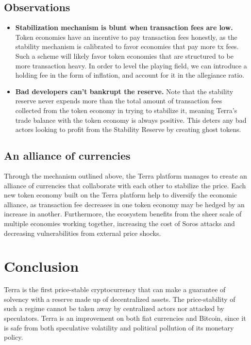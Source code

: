 \documentclass{article}
\begin{document}
        
        

\subsection{Observations}

\begin{itemize}
    \item \textbf{Stabilization mechanism is blunt when transaction fees are low.} Token economies have an incentive to pay transaction fees honestly, as the stability mechanism is calibrated to favor economies that pay more tx fees. Such a scheme will likely favor token economies that are structured to be more transaction heavy. In order to level the playing field, we can introduce a holding fee in the form of inflation, and account for it in the allegiance ratio. 
    
    \item \textbf{Bad developers can't bankrupt the reserve.} Note that the stability reserve never expends more than the total amount of transaction fees collected from the token economy in trying to stabilize it, meaning Terra's trade balance with the token economy is always positive. This deters any bad actors looking to profit from the Stability Reserve by creating ghost tokens. 
\end{itemize}

\subsection{An alliance of currencies}

Through the mechanism outlined above, the Terra platform manages to create an alliance of currencies that collaborate with each other to stabilize the price. Each new token economy built on the Terra platform help to diversify the economic alliance, as transaction fee decreases in one token economy may be hedged by an increase in another. Furthermore, the ecosystem benefits from the sheer scale of multiple economies working together, increasing the cost of Soros attacks and decreasing vulnerabilities from external price shocks. 


\section{Conclusion}

Terra is the first price-stable cryptocurrency that can make a guarantee of solvency with a reserve made up of decentralized assets. The price-stability of such a regime cannot be taken away by centralized actors nor attacked by speculators. Terra is an improvement on both fiat currencies and Bitcoin, since it is safe from both speculative volatility and political pollution of its monetary policy.  
\end{document}
